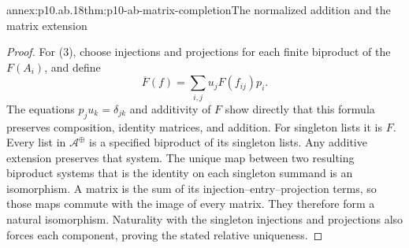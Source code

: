 \begin{annexitem}{annex:p10.ab.18}{thm:p10-ab-matrix-completion}{The normalized addition and the matrix extension}
\begin{proof}
For (3), choose injections and projections for each finite biproduct
of the \(F(A_i)\), and define
\[
 \overline F(f)=\sum_{i,j}u_jF(f_{ij})p_i.
\]
The equations \(p_j u_k=\delta_{jk}\) and additivity of \(F\)
show directly that this formula preserves composition, identity matrices,
and addition. For singleton lists it is \(F\).
Every list in \(\mathcal A^{\oplus}\) is a specified biproduct of
its singleton lists. Any additive extension preserves that system.
The unique map between two resulting biproduct systems that is the
identity on each singleton summand is an isomorphism. A matrix is
the sum of its injection--entry--projection terms, so those maps commute
with the image of every matrix. They therefore form a natural
isomorphism. Naturality with the singleton injections and projections
also forces each component, proving the stated relative uniqueness.
\end{proof}
\end{annexitem}

